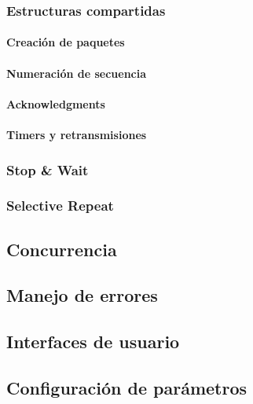 \subsubsection{Estructuras compartidas}
\paragraph{Creación de paquetes}
\paragraph{Numeración de secuencia}
\paragraph{Acknowledgments}
\paragraph{Timers y retransmisiones}
\subsubsection{Stop \& Wait}
\subsubsection{Selective Repeat}
\subsection{Concurrencia}
\subsection{Manejo de errores}
\subsection{Interfaces de usuario}
\subsection{Configuración de parámetros}